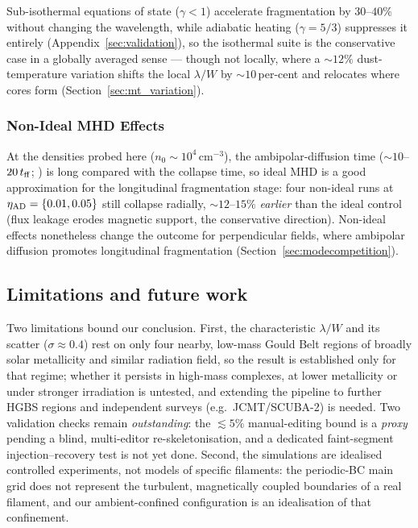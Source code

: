 \documentclass[usenatbib,twoside,twocolumn]{mnras}
\begin{document}
Sub-isothermal equations of state ($\gamma<1$) accelerate fragmentation by $30$--$40\%$ without changing the wavelength, while adiabatic heating ($\gamma=5/3$) suppresses it entirely (Appendix~\ref{sec:validation}), so the isothermal suite is the conservative case in a globally averaged sense --- though not locally, where a $\sim12\%$ dust-temperature variation shifts the local $\lambda/W$ by $\sim10$\,per-cent and relocates where cores form (Section~\ref{sec:mt_variation}).

\subsubsection{Non-Ideal MHD Effects}
\label{sec:nonideal}

At the densities probed here ($n_0\sim10^4$\,cm$^{-3}$), the ambipolar-diffusion time ($\sim10$--$20\,t_{\rm ff}$; \citealt{Tassis2004}) is long compared with the collapse time, so ideal MHD is a good approximation for the longitudinal fragmentation stage: four non-ideal runs at $\eta_{\rm AD}=\{0.01,0.05\}$ still collapse radially, $\sim12$--$15\%$ \textit{earlier} than the ideal control (flux leakage erodes magnetic support, the conservative direction). Non-ideal effects nonetheless change the outcome for perpendicular fields, where ambipolar diffusion promotes longitudinal fragmentation (Section~\ref{sec:modecompetition}).

\subsection{Limitations and future work}
\label{sec:limitations}

Two limitations bound our conclusion. First, the characteristic $\lambda/W$ and its scatter ($\sigma\approx0.4$) rest on only four nearby, low-mass Gould Belt regions of broadly solar metallicity and similar radiation field, so the result is established only for that regime; whether it persists in high-mass complexes, at lower metallicity or under stronger irradiation is untested, and extending the pipeline to further HGBS regions and independent surveys (e.g.\ JCMT/SCUBA-2) is needed. Two validation checks remain \emph{outstanding}: the $\lesssim5\%$ manual-editing bound is a \emph{proxy} pending a blind, multi-editor re-skeletonisation, and a dedicated faint-segment injection--recovery test is not yet done. Second, the simulations are idealised controlled experiments, not models of specific filaments: the periodic-BC main grid does not represent the turbulent, magnetically coupled boundaries of a real filament, and our ambient-confined configuration is an idealisation of that confinement.
\end{document}
